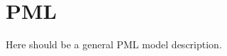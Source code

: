 \clearpage
\section{PML\label{sec:PML_models}}

Here should be a general PML model description.





